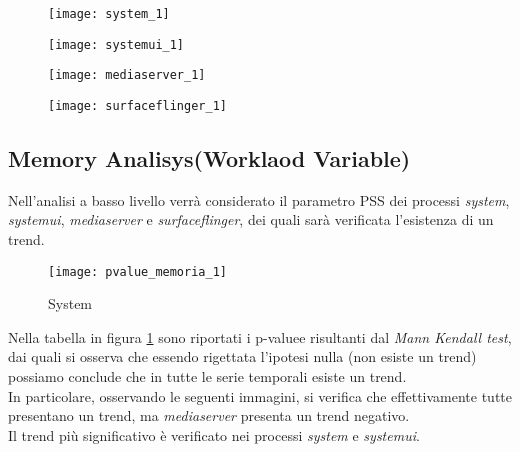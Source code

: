 \begin{minipage}{\linewidth}
  \centering
  \begin{minipage}{0.49\linewidth}
    \begin{figure}[H]
      \texttt{[image: system\_1]}
    \end{figure}
  \end{minipage}
  \begin{minipage}{0.49\linewidth}
    \begin{figure}[H]
      \texttt{[image: systemui\_1]}
    \end{figure}
  \end{minipage}
  \begin{minipage}{0.49\linewidth}
    \begin{figure}[H]
      \texttt{[image: mediaserver\_1]}
    \end{figure}
  \end{minipage}
  \begin{minipage}{0.49\linewidth}
    \begin{figure}[H]
      \texttt{[image: surfaceflinger\_1]}
    \end{figure}
  \end{minipage}
\end{minipage}

\clearpage
\subsection{Memory Analisys(Worklaod Variable)}

Nell'analisi a basso livello verrà considerato il parametro PSS dei processi \textit{system},
\textit{systemui}, \textit{mediaserver} e \textit{surfaceflinger}, dei quali
sarà verificata l'esistenza di un trend.\\

\begin{figure}[!htbp]
  \centering
  \texttt{[image: pvalue\_memoria\_1]}
  \caption{System}
  \label{pvalue_memoria_1}
\end{figure}

Nella tabella in figura \ref{pvalue_memoria_1} sono riportati i p-valuee risultanti
dal \textit{Mann Kendall test}, dai quali si osserva che essendo rigettata l'ipotesi
nulla (non esiste un trend) possiamo conclude che in tutte le serie temporali
esiste un trend.\\
In particolare, osservando le seguenti immagini, si verifica che effettivamente
tutte presentano un trend, ma \textit{mediaserver} presenta un trend negativo.\\
Il trend più significativo è verificato nei processi \textit{system} e \textit{systemui}.

